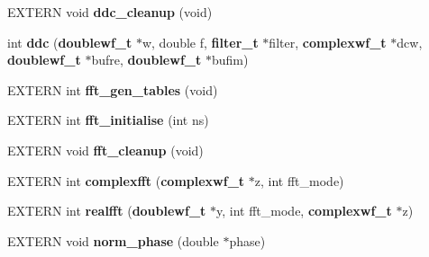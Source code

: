 \begin{CompactItemize}
EXTERN void {\bf ddc\_\-cleanup} (void)
\item 
int {\bf ddc} ({\bf doublewf\_\-t} $\ast$w, double f, {\bf filter\_\-t} $\ast$filter, {\bf complexwf\_\-t} $\ast$dcw, {\bf doublewf\_\-t} $\ast$bufre, {\bf doublewf\_\-t} $\ast$bufim)
\item 
EXTERN int {\bf fft\_\-gen\_\-tables} (void)
\item 
EXTERN int {\bf fft\_\-initialise} (int ns)
\item 
EXTERN void {\bf fft\_\-cleanup} (void)
\item 
EXTERN int {\bf complexfft} ({\bf complexwf\_\-t} $\ast$z, int fft\_\-mode)
\item 
EXTERN int {\bf realfft} ({\bf doublewf\_\-t} $\ast$y, int fft\_\-mode, {\bf complexwf\_\-t} $\ast$z)
\item 
EXTERN void {\bf norm\_\-phase} (double $\ast$phase)
\end{CompactItemize}
